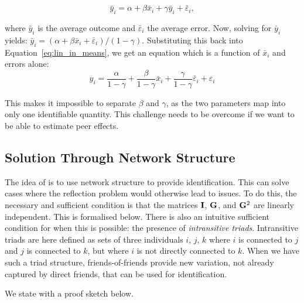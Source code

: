 \begin{equation}
    \label{eq:lin_in_means_expectation}
    \bar{y}_i = \alpha + \beta\bar{x}_i + \gamma\bar{y}_i + \bar{\varepsilon}_i,
\end{equation}

where $\bar{y}_i$ is the average outcome and $\bar{\varepsilon}_i$ the average error. Now, solving for $\bar{y}_i$ yields: $\bar{y}_i = (\alpha + \beta\bar{x}_i + \bar{\varepsilon}_i)/(1-\gamma)$. Substituting this back into Equation~\eqref{eq:lin_in_means}, we get an equation which is a function of $\bar{x}_i$ and errors alone:
\begin{equation}
    y_i = \frac{\alpha}{1-\gamma} + \frac{\beta}{1-\gamma}\bar{x}_i + \frac{\gamma}{1-\gamma}\bar{\varepsilon}_i + \varepsilon_i
\end{equation}

This makes it impossible to separate $\beta$ and $\gamma$, as the two parameters map into only one identifiable quantity. This challenge needs to be overcome if we want to be able to estimate peer effects.


\subsection{Solution Through Network Structure}

The idea of \textcite{Bramoulle2009} is to use network structure to provide identification. This can solve cases where the reflection problem would otherwise lead to issues. To do this, the necessary and sufficient condition is that the matrices $\mathbf{I}$, $\mathbf{G}$, and $\mathbf{G}^2$ are linearly independent. This is formalised below. There is also an intuitive sufficient condition for when this is possible: the presence of \emph{intransitive triads}. Intransitive triads are here defined as sets of three individuals $i$, $j$, $k$ where $i$ is connected to $j$ and $j$ is connected to $k$, but where $i$ is not directly connected to $k$. When we have such a triad structure, friends-of-friends provide new variation, not already captured by direct friends, that can be used for identification.

We state \textcite[Proposition~1, p.~44]{Bramoulle2009} with a proof sketch below.

